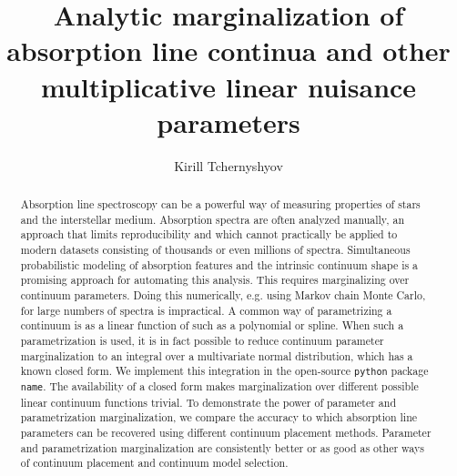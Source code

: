 \documentclass[manuscript]{aastex62}
\newcommand{\pkgname}{\texttt{name}}
\begin{document}
\title{Analytic marginalization of absorption line continua and other multiplicative linear nuisance parameters}

\author[0000-0003-0789-9939]{Kirill Tchernyshyov}


\begin{abstract}
Absorption line spectroscopy can be a powerful way of measuring properties of stars and the interstellar medium.
Absorption spectra are often analyzed manually, an approach that limits reproducibility and which cannot practically be applied to modern datasets consisting of thousands or even millions of spectra.
Simultaneous probabilistic modeling of absorption features and the intrinsic continuum shape is a promising approach for automating this analysis.
This requires marginalizing over continuum parameters.
Doing this numerically, e.g. using Markov chain Monte Carlo, for large numbers of spectra is impractical.
A common way of parametrizing a continuum is as a linear function of such as a polynomial or spline.
When such a parametrization is used, it is in fact possible to reduce continuum parameter marginalization to an integral over a multivariate normal distribution, which has a known closed form.
We implement this integration in the open-source \texttt{python} package \pkgname.
The availability of a closed form makes marginalization over different possible linear continuum functions trivial.
To demonstrate the power of parameter and parametrization marginalization, we compare the accuracy to which absorption line parameters can be recovered using different continuum placement methods.
Parameter and parametrization marginalization are consistently better or as good as other ways of continuum placement and continuum model selection.
\end{abstract}

\end{document}
